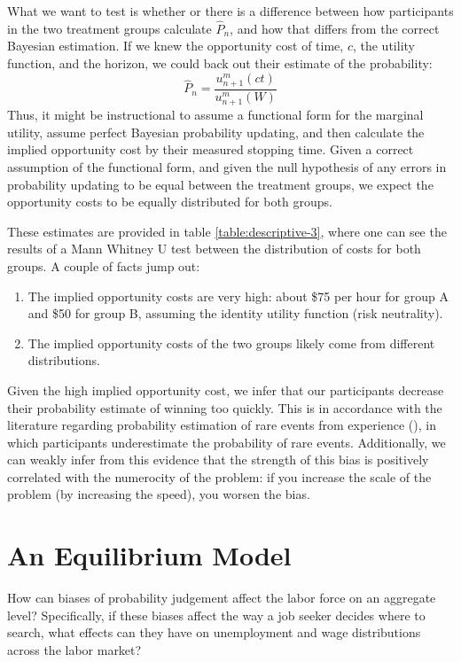 \documentclass[a4paper,12pt]{article}
\begin{document}
What we want to test is whether or there is a difference between how participants in the two treatment groups calculate $\hat{P}_n$, and how that differs from the correct Bayesian estimation. If we knew the opportunity cost of time, $c$, the utility function, and the horizon, we could back out their estimate of the probability:
$$
\hat{P}_{n}  = \frac{u^m_{n+1}(ct)}{u^m_{n+1}(W)}
$$
%
Thus, it might be instructional to assume a functional form for the marginal utility, assume perfect Bayesian probability updating, and then calculate the implied opportunity cost by their measured stopping time. Given a correct assumption of the functional form, and given the null hypothesis of any errors in probability updating to be equal between the treatment groups, we expect the opportunity costs to be equally distributed for both groups.

These estimates are provided in table \ref{table:descriptive-3}, where one can see the results of a Mann Whitney U test between the distribution of costs for both groups. A couple of facts jump out:

\begin{enumerate}
\item The implied opportunity costs are very high: about \$75 per hour for group A and \$50 for group B, assuming the identity utility function (risk neutrality).
\item The implied opportunity costs of the two groups likely come from different distributions.
\end{enumerate}

Given the high implied opportunity cost, we infer that our participants decrease their probability estimate of winning too quickly. This is in accordance with the literature regarding probability estimation of rare events from experience (\cite{hertwig2004}), in which participants underestimate the probability of rare events. Additionally, we can weakly infer from this evidence that the strength of this bias is positively correlated with the numerocity of the problem: if you increase the scale of the problem (by increasing the speed), you worsen the bias.


\section{ An Equilibrium Model }

How can biases of probability judgement affect the labor force on an aggregate level? Specifically, if these biases affect the way a job seeker decides where to search, what effects can they have on unemployment and wage distributions across the labor market?
\end{document}
